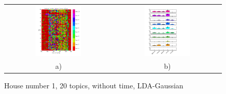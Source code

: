 \begin{figure}
 \centering
 \begin{tabular}{c c}
  \includegraphics[width=0.45\textwidth]{Pictures/DayHN1TS48k20zonerTijd.png}
  &
  \includegraphics[width=0.45\textwidth]{Pictures/TopHN1TS48k20zonerTijd.png}\\
  a) & b)
 \end{tabular}
  \caption{House number 1, 20 topics, without time, LDA-Gaussian}
  \label{fig:ohneZeitGaus}
\end{figure}

